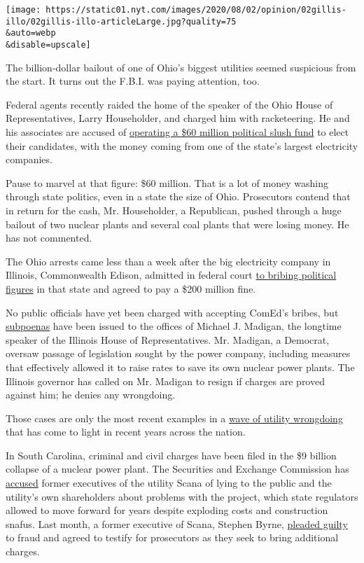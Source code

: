 \texttt{[image: https://static01.nyt.com/images/2020/08/02/opinion/02gillis-illo/02gillis-illo-articleLarge.jpg?quality=75\\\&auto=webp\\\&disable=upscale]}

The billion-dollar bailout of one of Ohio's biggest utilities seemed
suspicious from the start. It turns out the F.B.I. was paying attention,
too.

Federal agents recently raided the home of the speaker of the Ohio House
of Representatives, Larry Householder, and charged him with
racketeering. He and his associates are accused of
\href{about:blank}{operating a \$60 million political slush fund} to
elect their candidates, with the money coming from one of the state's
largest electricity companies.

Pause to marvel at that figure: \$60 million. That is a lot of money
washing through state politics, even in a state the size of Ohio.
Prosecutors contend that in return for the cash, Mr. Householder, a
Republican, pushed through a huge bailout of two nuclear plants and
several coal plants that were losing money. He has not commented.

The Ohio arrests came less than a week after the big electricity company
in Illinois, Commonwealth Edison, admitted in federal court
\href{about:blank}{to bribing political figures} in that state and
agreed to pay a \$200 million fine.

No public officials have yet been charged with accepting ComEd's bribes,
but
\href{https://www.npr.org/local/309/2020/07/20/893009659/breaking-down-the-com-ed-patronage-scandal-and-what-s-next-for-michael-madigan}{subpoenas}
have been issued to the offices of Michael J. Madigan, the longtime
speaker of the Illinois House of Representatives. Mr. Madigan, a
Democrat, oversaw passage of legislation sought by the power company,
including measures that effectively allowed it to raise rates to save
its own nuclear power plants. The Illinois governor has called on Mr.
Madigan to resign if charges are proved against him; he denies any
wrongdoing.

Those cases are only the most recent examples in a
\href{https://www.energyandpolicy.org/utility-corruption/}{wave of
utility wrongdoing} that has come to light in recent years across the
nation.

In South Carolina, criminal and civil charges have been filed in the \$9
billion collapse of a nuclear power plant. The Securities and Exchange
Commission has
\href{https://www.wsj.com/articles/sec-charges-south-carolina-companies-executives-in-failed-nuclear-project-case-11582855101}{accused}
former executives of the utility Scana of lying to the public and the
utility's own shareholders about problems with the project, which state
regulators allowed to move forward for years despite exploding costs and
construction snafus. Last month, a former executive of Scana, Stephen
Byrne,
\href{https://www.postandcourier.com/business/former-scana-executive-pleads-guilty-to-charges-tied-to-failed-sc-nuclear-project/article_26e23ca8-c50b-11ea-8377-e7b39854212b.html}{pleaded
guilty} to fraud and agreed to testify for prosecutors as they seek to
bring additional charges.

